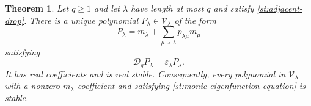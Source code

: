 \documentclass[reqno, 12pt]{article}
\numberwithin{equation}{section}
\newtheorem{theorem}{Theorem}[section]
\theoremstyle{definition}
\begin{document}
\begin{theorem}\label{st:stable-eigenfunction}
Let $q\geq1$ and let $\lambda$ have length at most $q$ and satisfy
\eqref{st:adjacent-drop}.  There is a unique polynomial
$P_\lambda\in\mathcal V_\lambda$ of the form
\begin{equation}\label{st:monic-eigenfunction-form}
P_\lambda=m_\lambda+\sum_{\mu\prec\lambda}p_{\lambda\mu}m_\mu
\end{equation}
satisfying
\begin{equation}\label{st:monic-eigenfunction-equation}
\mathcal D_qP_\lambda=\varepsilon_\lambda P_\lambda.
\end{equation}
It has real coefficients and is real stable.  Consequently, every
polynomial in $\mathcal V_\lambda$ with a nonzero $m_\lambda$
coefficient and satisfying \eqref{st:monic-eigenfunction-equation}
is stable.
\end{theorem}
\end{document}
